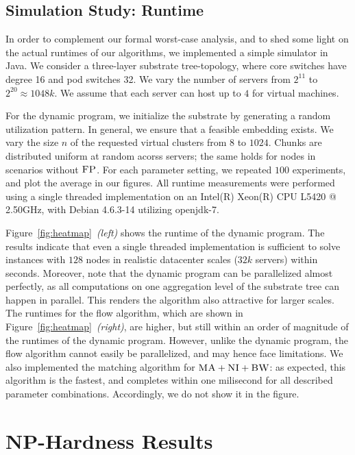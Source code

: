 \documentclass[conference,10pt]{IEEEtran}
\newcommand{\CC}{\textsc{NI}}
\newcommand{\FP}{\textsc{FP}}
\newcommand{\BW}{\textsc{BW}}
\newcommand{\MA}{\textsc{MA}}
\begin{document}
\subsection{Simulation Study: Runtime}

In order to complement our formal worst-case analysis,
and to shed some light on the actual runtimes of
our algorithms, 
we implemented a simple simulator in Java. 
We consider a three-layer substrate tree-topology,
where core switches have degree 16 and
pod switches 32. We vary the number
of servers from $2^{11}$ to $2^{20}\approx 1048k$.
We assume that each server can host  
up to $4$ for virtual machines. 

For the dynamic program, we initialize the substrate by generating a
random utilization pattern. In general, we ensure
that a feasible embedding exists. 
We vary the size $n$ of the 
requested virtual clusters from 
$8$ to $1024$. Chunks are distributed uniform at random acorss servers;
the same holds for nodes in scenarios without $\FP$. 
For each parameter setting, we repeated $100$ experiments,
and plot the average in our figures. 
All runtime measurements were performed using 
a single threaded implementation on an Intel(R) Xeon(R) CPU L5420  @ 2.50GHz, 
with Debian 4.6.3-14 utilizing openjdk-7.

Figure~\ref{fig:heatmap}~\textit{(left)} shows the runtime of the dynamic program. 
The results indicate that even a single threaded implementation 
is sufficient to solve instances with $128$ nodes in realistic datacenter scales
 ($32k$ servers) within seconds. 
 Moreover, note that the dynamic program can be parallelized almost perfectly, 
 as all computations on one aggregation level of the substrate tree can happen in parallel.
 This renders the algorithm also attractive for larger scales. 
 The runtimes for the flow algorithm, which are shown in Figure~\ref{fig:heatmap}~\textit{(right)}, are higher, but still within an order of magnitude of the runtimes of the dynamic program. 
 However, unlike the dynamic program, the flow algorithm cannot easily be parallelized,
 and may hence face limitations. 
 We also implemented the matching algorithm for $\MA + \CC + \BW$:
 as expected, this algorithm is the fastest, and completes 
 within one milisecond for all described parameter combinations. Accordingly,
 we do not show it in the figure.

\section{NP-Hardness Results}\label{sec:np}
\end{document}
